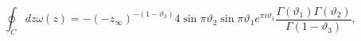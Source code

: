 \begin{equation}
\label{B}
\oint_{C} dz \omega(z)=-(-z_{\infty})^{-(1-\vartheta_{3})}4\sin
  \pi \vartheta_{2}\sin \pi\vartheta_{1} e^{\pi i \vartheta_{1}}
  \frac{\Gamma(\vartheta_{1})\Gamma(\vartheta_{2})}{\Gamma(1-\vartheta_{3})} ,
\end{equation} 
